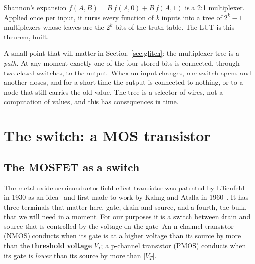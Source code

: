 \documentclass[11pt,a4paper]{article}
\newcommand{\VT}{V_{T}}
\newcommand{\ovl}[1]{\overline{#1}}
\begin{document}
\begin{merke}
Shannon's expansion $f(A,B)=\ovl B\,f(A,0)+B\,f(A,1)$ is a 2:1
multiplexer. Applied once per input, it turns every function of $k$
inputs into a tree of $2^k-1$ multiplexers whose leaves are the $2^k$
bits of the truth table. The LUT is this theorem, built.
\end{merke}

A small point that will matter in Section~\ref{sec:glitch}: the
multiplexer tree is a \emph{path}. At any moment exactly one of the
four stored bits is connected, through two closed switches, to the
output. When an input changes, one switch opens and another closes, and
for a short time the output is connected to nothing, or to a node that
still carries the old value. The tree is a selector of wires, not a
computation of values, and this has consequences in time.

\section{The switch: a MOS transistor}
\label{sec:switch}

\subsection{The MOSFET as a switch}

The metal-oxide-semiconductor field-effect transistor was patented by
Lilienfeld in 1930 as an idea~\cite{Lilienfeld1930} and first made to
work by Kahng and Atalla in 1960~\cite{Kahng1960}. It has three
terminals that matter here, gate, drain and source, and a fourth, the
bulk, that we will need in a moment. For our purposes it is a switch
between drain and source that is controlled by the voltage on the gate.
An n-channel transistor (NMOS) conducts when its gate is at a higher
voltage than its source by more than the \textbf{threshold voltage}
$\VT$; a p-channel transistor (PMOS) conducts when its gate is
\emph{lower} than its source by more than $|\VT|$.
\end{document}
